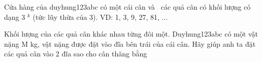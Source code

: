 Cửa hàng của duyhung123abc có một cái cân và  các quả cân có khối lượng có dạng 3   $^    k   $   (tức lũy thừa của 3). VD: 1, 3, 9, 27, 81, ...  

   Khối lượng của các quả cân khác nhau từng đôi một. Duyhung123abc có một vật nặng M kg, vật nặng được đặt vào đĩa bên trái của cái cân. Hãy giúp anh ta đặt các quả cân vào 2 đĩa sao cho cân thãng bằng